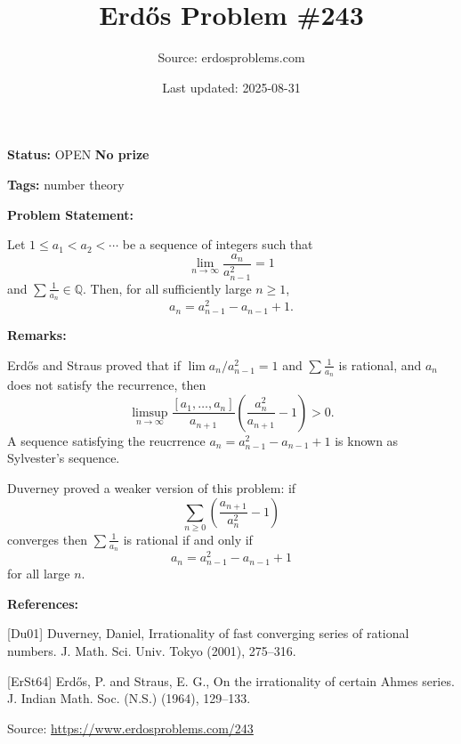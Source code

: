 \documentclass{article}
\title{Erd\H{o}s Problem \#243}
\date{Last updated: 2025-08-31}
\author{Source: erdosproblems.com}
\begin{document}
\maketitle

\noindent\textbf{Status:} OPEN \quad \textbf{No prize}

\noindent\textbf{Tags:} number theory

\medskip
\noindent\textbf{Problem Statement:}

Let $1\leq a_1<a_2<\cdots$ be a sequence of integers such that\[\lim_{n\to \infty}\frac{a_n}{a_{n-1}^2}=1\]and $\sum\frac{1}{a_n}\in \mathbb{Q}$. Then, for all sufficiently large $n\geq 1$,\[ a_n = a_{n-1}^2-a_{n-1}+1.\]

\bigskip
\noindent\textbf{Remarks:}

Erd\H{o}s and Straus \cite{ErSt64} proved that if $\lim a_n/a_{n-1}^2=1$ and $\sum \frac{1}{a_n}$ is rational, and $a_n$ does not satisfy the recurrence, then\[\limsup_{n\to \infty} \frac{[a_1,\ldots,a_n]}{a_{n+1}}\left(\frac{a_n^2}{a_{n+1}}-1\right)>0.\]A sequence satisfying the reucrrence $a_n = a_{n-1}^2-a_{n-1}+1$ is known as Sylvester's sequence.

Duverney \cite{Du01} proved a weaker version of this problem: if\[\sum_{n\geq 0}\left(\frac{a_{n+1}}{a_n^2}-1\right)\]converges then $\sum \frac{1}{a_n}$ is rational if and only if\[a_{n}=a_{n-1}^2-a_{n-1}+1\]for all large $n$.

\bigskip
\noindent\textbf{References:}

[Du01] Duverney, Daniel, Irrationality of fast converging series of rational numbers. J. Math. Sci. Univ. Tokyo (2001), 275--316.
 
 [ErSt64] Erd\H{o}s, P. and Straus, E. G., On the irrationality of certain {A}hmes series. J. Indian Math. Soc. (N.S.) (1964), 129--133.

\bigskip
\noindent\small{Source: \url{https://www.erdosproblems.com/243}}
\end{document}
